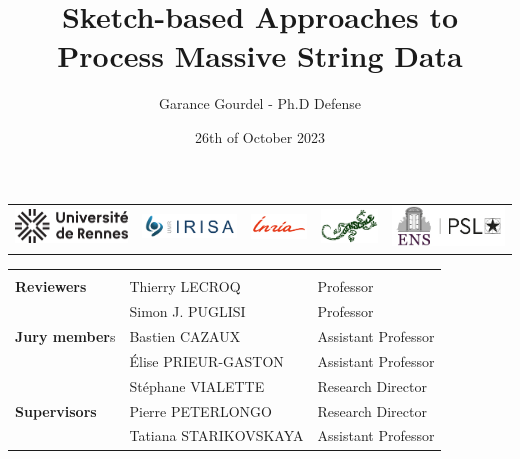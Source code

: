 \documentclass[aspectratio=169]{beamer}
\title{Sketch-based Approaches to Process Massive String Data}
\author{Garance Gourdel - Ph.D Defense}
\date{26th of October 2023}
\begin{document}
\begin{frame}

  \titlepage
  \begin{center}
  \begin{tabular}{ccccc}
    \includegraphics[width=3cm]{logos/01_UNIRENNES.png}&
    \includegraphics[width=2.5cm]{logos/02_IRISA.png}&
    \includegraphics[width=1.5cm]{logos/03_inria.png}&
    \includegraphics[width=1.5cm]{logos/03b_logo_genscale.png}&
    \includegraphics[width=3cm]{logos/05_EN_horiz.jpg}
  \end{tabular}
  \medskip
  \small
  \begin{tabular}{l l l}
  \arrayrulecolor{gray}\hline \\
    \textbf{Reviewers}  &   Thierry LECROQ	&   Professor \\
                        & Simon J. PUGLISI	&    Professor\\
    \textbf{Jury member}s    & Bastien CAZAUX & Assistant Professor\\
                    & Élise PRIEUR-GASTON & Assistant Professor\\
                    & Stéphane VIALETTE	 & Research Director\\
    \textbf{Supervisors}     & Pierre PETERLONGO	& Research Director\\
                    & Tatiana STARIKOVSKAYA	& Assistant Professor\\
  \end{tabular}
  \end{center}
  \vfill
\end{frame}
\end{document}
